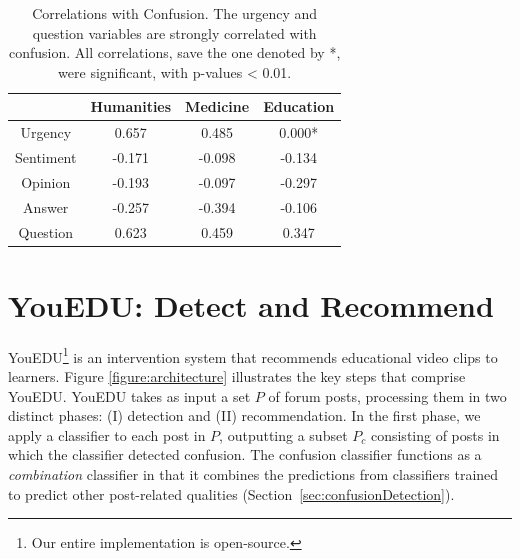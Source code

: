 \documentclass{edm_template}
\begin{document}
\begin{table}
       \centering
       \begin{tabular}{|c|c|c|c|}
       \hline
          & Humanities & Medicine & Education \\ \hline
        Urgency   & 0.657                & 0.485              & 0.000* \\ \hline
        Sentiment & -0.171                & -0.098             & -0.134 \\ \hline
        Opinion   & -0.193                & -0.097             & -0.297 \\ \hline
        Answer    & -0.257                & -0.394             & -0.106  \\ \hline
        Question  & 0.623                & 0.459              & 0.347  \\ \hline
       \end{tabular}
       \vspace{-5pt}
       \caption{\textnormal{
       Correlations with Confusion. The urgency and question variables are strongly correlated with confusion. All correlations, save the one denoted by *, were significant, with p-values < 0.01.
       }} 
       \label{table:correlations} %
\end{table}


\section{YouEDU: Detect and Recommend}
\label{sec:arch}

YouEDU\footnote{Our entire implementation is open-source.} is an intervention system that recommends educational video clips to learners. Figure \ref{figure:architecture} illustrates the key steps that comprise YouEDU. YouEDU takes as input a set $P$ of forum posts, processing them in two distinct phases: (I) detection and (II) recommendation. In the first phase, we apply a classifier to each post in $P$, outputting a subset $P_{c}$ consisting of posts in which the classifier detected confusion. The confusion classifier functions as a \emph{combination} classifier in that it combines the predictions from classifiers trained to predict other post-related qualities (Section~\ref{sec:confusionDetection}).
\end{document}
